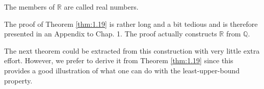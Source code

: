 The members of $\mathbb{R}$ are called real numbers.

The proof of Theorem \ref{thm:1.19} is rather long and a bit tedious and is therefore
presented in an Appendix to Chap. 1. The proof actually constructs $\mathbb{R}$ from $\mathbb{Q}$.

The next theorem could be extracted from this construction with very
little extra effort. However, we prefer to derive it from Theorem \ref{thm:1.19} since this
provides a good illustration of what one can do with the least-upper-bound
property.


\begin{thm}
    
\end{thm}
